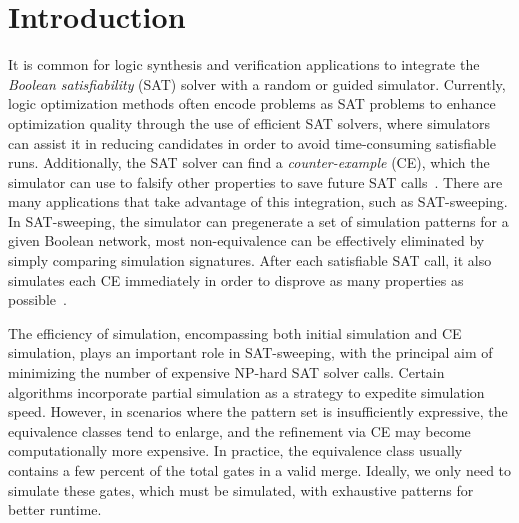 \documentclass[conference]{IEEEtran}
\begin{document}
\vspace{-2mm}

\setlength{\arraycolsep}{1.5pt}
\renewcommand\arraystretch{0.5}
\section{Introduction}
\label{sec1}
It is common for logic synthesis and verification applications to integrate the \emph{Boolean satisfiability} (SAT) solver with a random or guided simulator.
Currently, logic optimization methods often encode problems as SAT problems to enhance optimization quality through the use of efficient SAT solvers, where simulators can assist it in reducing candidates in order to avoid time-consuming satisfiable runs. 
Additionally, the SAT solver can find a \emph{counter-example} (CE), which the simulator can use to falsify other properties to save future SAT calls~\cite{intro1}.
There are many applications that take advantage of this integration, such as SAT-sweeping.
In SAT-sweeping, the simulator can pregenerate a set of simulation patterns for a given Boolean network, most non-equivalence can be effectively eliminated by simply comparing simulation signatures.
After each satisfiable SAT call, it also simulates each CE immediately in order to disprove as many properties as possible~\cite{intro3,intro4,intro2}.

The efficiency of simulation, encompassing both initial simulation and CE simulation, plays an important role in SAT-sweeping, with the principal aim of minimizing the number of expensive NP-hard SAT solver calls.
Certain algorithms incorporate partial simulation as a strategy to expedite simulation speed. 
However, in scenarios where the pattern set is insufficiently expressive, the equivalence classes tend to enlarge, and the refinement via CE may become computationally more expensive.
In practice, the equivalence class usually contains a few percent of the total gates in a valid merge.
Ideally, we only need to simulate these gates, which must be simulated, with exhaustive patterns for better runtime.
\end{document}
